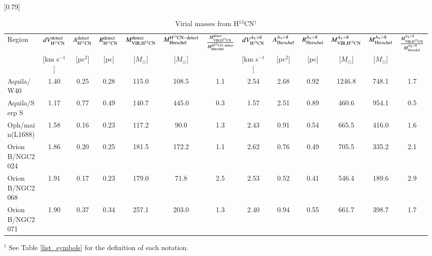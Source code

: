 %
\begin{table*}
\scalebox{0.79}[0.79]{
\centering
\begin{threeparttable}
\caption{Virial masses from H$^{13}$CN$^\dag$ \label{table:virial_h13cn}}
\begin{tabular}{|l|cccccc|cccccc|}
\hline
Region & $dV_{\rm H^{13}CN}^{\rm detect}$ & $A_{\rm H^{13}CN}^{\rm detect}$ & $R_{\rm H^{13}CN}^{\rm detect}$ & $M_{\rm VIR,H^{13}CN}^{\rm detect}$& $M_{\rm Herschel}^{\rm H^{13}CN-detect}$ & $\frac{M_{\rm VIR,H^{13}CN}^{\rm detect}}{M_{\rm Herschel}^{\rm H^{13}CN-detect}}$  & $dV_{\rm H^{13}CN}^{A_{\rm V}>8}$ & $A_{\rm Herschel}^{A_{\rm V}>8}$ & $R_{\rm Herschel}^{A_{\rm V}>8}$ & $M_{\rm VIR,H^{13}CN}^{A_{\rm V}>8}$ & $M_{\rm Herschel}^{A_{\rm V}>8}$ & $\frac{M_{\rm VIR,H^{13}CN}^{A_{\rm V}>8}}{M_{\rm Herschel}^{A_{\rm V}>8}}$ 
\\
 & [km s$^{-1}$] & [pc$^2$] & [pc] & [$M_{\odot}$] & [$M_{\odot}$]  &  & [km s$^{-1}$] & [pc$^2$] & [pc] & [$M_{\odot}$] &  [$M_{\odot}$]  & \\  
\hline
Aquila/W40&  1.40&  0.25&  0.28&   115.0&   108.5&  1.1&  2.54&  2.68&  0.92&  1246.8&   748.1&   1.7\\
Aquila/Serp S&  1.17&  0.77&  0.49&   140.7&   445.0&   0.3&  1.57&  2.51&  0.89&   460.6&   954.1&   0.5\\
\hline
Oph/main(L1688)&  1.58&  0.16&  0.23&   117.2&    90.0&   1.3&  2.43&  0.91&  0.54&   665.5&   416.0&   1.6\\
\hline
Orion B/NGC2024&  1.86&  0.20&  0.25&   181.5&   172.2&   1.1&  2.62&  0.76&  0.49&   705.5&   335.2&   2.1\\
Orion B/NGC2068&  1.91&  0.17&  0.23&   179.0&    71.8&   2.5&  2.53&  0.52&  0.41&   546.4&   189.6&   2.9\\
Orion B/NGC2071&  1.90&  0.37&  0.34&   257.1&   203.0&   1.3&  2.40&  0.94&  0.55&   661.7&   398.7&   1.7\\
\hline
\end{tabular}
\begin{tablenotes}
\item[$^\dag$] {See Table \ref{list_symbols} for the definition of each notation.}
\end{tablenotes}
\end{threeparttable}
}
\end{table*}
